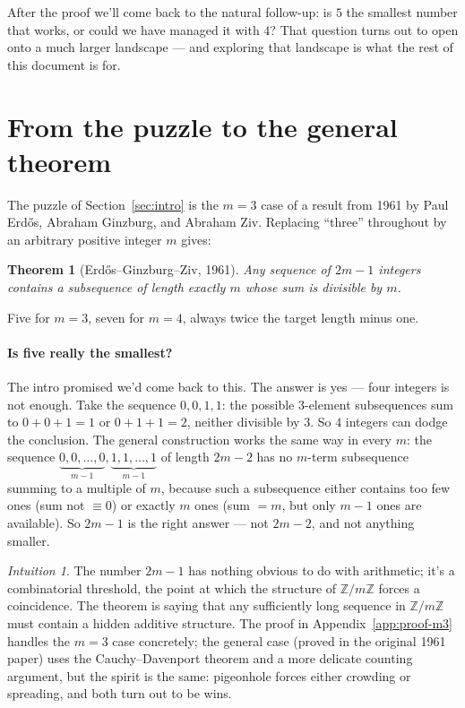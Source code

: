 \documentclass[11pt,a4paper]{article}
\theoremstyle{plain}
\newtheorem{theorem}{Theorem}[section]
\theoremstyle{definition}
\theoremstyle{remark}
\newtheorem*{intuition}{Intuition}
\newcommand{\Z}{\mathbb{Z}}
\begin{document}
After the proof we'll come back to the natural follow-up: is $5$ the
smallest number that works, or could we have managed it with $4$? That
question turns out to open onto a much larger landscape --- and
exploring that landscape is what the rest of this document is for.

\section{From the puzzle to the general theorem}\label{sec:from-puzzle-to-theorem}

The puzzle of Section~\ref{sec:intro} is the $m=3$ case of a result from
1961 by Paul Erd\H{o}s, Abraham Ginzburg, and Abraham Ziv. Replacing
``three'' throughout by an arbitrary positive integer $m$ gives:

\begin{theorem}[Erd\H{o}s--Ginzburg--Ziv, 1961]
\label{thm:egz-classical}
Any sequence of $2m-1$ integers contains a subsequence of length exactly $m$ whose sum is divisible by $m$.
\end{theorem}

Five for $m = 3$, seven for $m = 4$, always twice the target length minus one.

\paragraph{Is five really the smallest?}
The intro promised we'd come back to this. The answer is yes ---
four integers is not enough. Take the sequence $0, 0, 1, 1$: the
possible $3$-element subsequences sum to $0+0+1=1$ or $0+1+1=2$, neither
divisible by $3$. So $4$ integers can dodge the conclusion. The general
construction works the same way in every $m$: the sequence
$\underbrace{0, 0, \ldots, 0}_{m-1}, \underbrace{1, 1, \ldots, 1}_{m-1}$
of length $2m - 2$ has no $m$-term subsequence summing to a multiple of
$m$, because such a subsequence either contains too few ones (sum not
$\equiv 0$) or exactly $m$ ones (sum $= m$, but only $m-1$ ones are
available). So $2m-1$ is the right answer --- not $2m-2$, and not
anything smaller.

\begin{intuition}
The number $2m - 1$ has nothing obvious to do with arithmetic; it's a
combinatorial threshold, the point at which the structure of $\Z/m\Z$
forces a coincidence. The theorem is saying that any sufficiently long
sequence in $\Z/m\Z$ must contain a hidden additive structure. The
proof in Appendix~\ref{app:proof-m3} handles the $m=3$ case
concretely; the general case (proved in the original 1961 paper) uses
the Cauchy--Davenport theorem and a more delicate counting argument,
but the spirit is the same: pigeonhole forces either crowding or
spreading, and both turn out to be wins.
\end{intuition}
\end{document}
